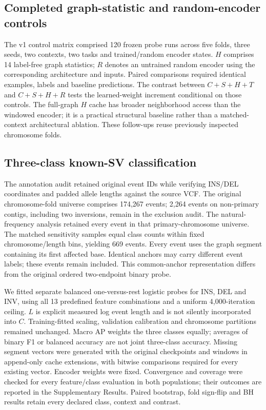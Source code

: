 \subsection{Completed graph-statistic and random-encoder controls}

The v1 control matrix comprised 120 frozen probe runs across five folds, three seeds, two contexts, two tasks and trained/random encoder states. $H$ comprises 14 label-free graph statistics; $R$ denotes an untrained random encoder using the corresponding architecture and inputs. Paired comparisons required identical examples, labels and baseline predictions. The contrast between $C+S+H+T$ and $C+S+H+R$ tests the learned-weight increment conditional on those controls. The full-graph $H$ cache has broader neighborhood access than the windowed encoder; it is a practical structural baseline rather than a matched-context architectural ablation. These follow-ups reuse previously inspected chromosome folds.

\subsection{Three-class known-SV classification}

The annotation audit retained original event IDs while verifying INS/DEL coordinates and padded allele lengths against the source VCF. The original chromosome-fold universe comprises 174,267 events; 2,264 events on non-primary contigs, including two inversions, remain in the exclusion audit. The natural-frequency analysis retained every event in that primary-chromosome universe. The matched sensitivity samples equal class counts within fixed chromosome/length bins, yielding 669 events. Every event uses the graph segment containing its first affected base. Identical anchors may carry different event labels; these events remain included. This common-anchor representation differs from the original ordered two-endpoint binary probe.

We fitted separate balanced one-versus-rest logistic probes for INS, DEL and INV, using all 13 predefined feature combinations and a uniform 4,000-iteration ceiling. $L$ is explicit measured log event length and is not silently incorporated into $C$. Training-fitted scaling, validation calibration and chromosome partitions remained unchanged. Macro AP weights the three classes equally; averages of binary F1 or balanced accuracy are not joint three-class accuracy. Missing segment vectors were generated with the original checkpoints and windows in append-only cache extensions, with bitwise comparisons required for every existing vector. Encoder weights were fixed. Convergence and coverage were checked for every feature/class evaluation in both populations; their outcomes are reported in the Supplementary Results. Paired bootstrap, fold sign-flip and BH results retain every declared class, context and contrast.

